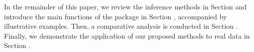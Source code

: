 {
In the remainder of this paper, we review the inference methods in Section  and introduce the main functions of the package in Section , accompanied by illustrative examples. Then, a comparative analysis is conducted in Section . Finally, we demonstrate the application of our proposed methods to real data in Section .
}


